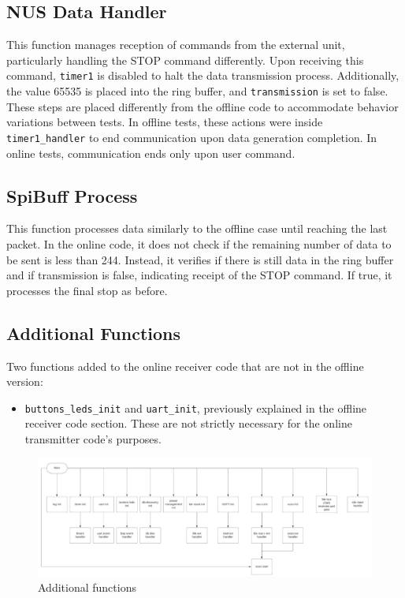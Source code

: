 \documentclass{Configuration_Files/PoliMi3i_thesis}
\begin{document}
\subsection*{NUS Data Handler}
This function manages reception of commands from the external unit, particularly handling the STOP command differently. Upon receiving this command, \texttt{timer1} is disabled to halt the data transmission process. Additionally, the value 65535 is placed into the ring buffer, and \texttt{transmission} is set to false. These steps are placed differently from the offline code to accommodate behavior variations between tests. In offline tests, these actions were inside \texttt{timer1\_handler} to end communication upon data generation completion. In online tests, communication ends only upon user command.

\subsection*{SpiBuff Process}
This function processes data similarly to the offline case until reaching the last packet. In the online code, it does not check if the remaining number of data to be sent is less than 244. Instead, it verifies if there is still data in the ring buffer and if transmission is false, indicating receipt of the STOP command. If true, it processes the final stop as before.

\subsection*{Additional Functions}
Two functions added to the online receiver code that are not in the offline version:
\begin{itemize}
    \item \texttt{buttons\_leds\_init} and \texttt{uart\_init}, previously explained in the offline receiver code section. These are not strictly necessary for the online transmitter code's purposes.
\end{itemize}

\begin{figure}[H]
	\includegraphics[scale=0.3]{Previous Implementation/Screenshot 2024-08-15 at 11.01.10.png}
	\centering
    \caption{Additional functions}
    \label{prev_7}
\end{figure}
\end{document}
